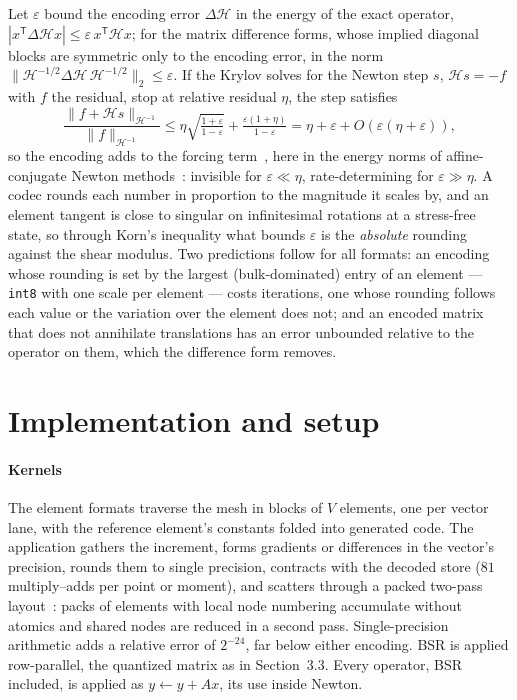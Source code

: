 \documentclass[sigconf,review]{acmart}
\newcommand{\eps}{\varepsilon}
\begin{document}
Let $\eps$ bound the encoding error $\Delta\mathcal{H}$ in the energy of the exact operator,
$|x^{\mathsf T}\Delta\mathcal{H}x|\le\eps\,x^{\mathsf T}\mathcal{H}x$; for the matrix difference
forms, whose implied diagonal blocks are symmetric only to the encoding error, in the norm
$\|\mathcal{H}^{-1/2}\Delta\mathcal{H}\,\mathcal{H}^{-1/2}\|_2\le\eps$.  If the Krylov solves for the
Newton step $s$, $\mathcal{H}s=-f$ with $f$ the residual, stop at relative residual $\eta$, the step
satisfies
\begin{equation}
  \frac{\|f+\mathcal{H}s\|_{\mathcal{H}^{-1}}}{\|f\|_{\mathcal{H}^{-1}}}
  \le \eta\sqrt{\tfrac{1+\eps}{1-\eps}} + \tfrac{\eps(1+\eta)}{1-\eps} = \eta+\eps+O(\eps(\eta+\eps)),
  \label{eq:forcing}
\end{equation}
so the encoding adds to the forcing term~\cite{Catinas2001}, here in the energy norms of
affine-conjugate Newton methods~\cite{Deuflhard2004}: invisible for $\eps\ll\eta$, rate-determining for
$\eps\gg\eta$.  A codec rounds each number in proportion to the magnitude it scales by, and an
element tangent is close to singular on infinitesimal rotations at a stress-free state, so through
Korn's inequality what bounds $\eps$ is the \emph{absolute} rounding against the shear modulus.  Two
predictions follow for all formats: an encoding whose rounding is set by the largest
(bulk-dominated) entry of an element --- \texttt{int8} with one scale per element --- costs
iterations, one whose rounding follows each value or the variation over the element does not; and
an encoded matrix that does not annihilate translations has an error unbounded relative to the
operator on them, which the difference form removes.

\section{Implementation and setup}

\paragraph{Kernels}  The element formats traverse the mesh in blocks of $V$ elements, one per vector
lane, with the reference element's constants folded into generated code.  The application gathers
the increment, forms gradients or differences in the vector's precision, rounds them to single
precision, contracts with the decoded store ($81$ multiply--adds per point or moment), and scatters
through a packed two-pass layout~\cite{PackedMesh}: packs of elements with local node numbering accumulate without
atomics and shared nodes are reduced in a second pass.  Single-precision arithmetic adds a relative
error of $2^{-24}$, far below either encoding.  BSR is applied row-parallel, the quantized matrix as
in Section~3.3.  Every operator, BSR included, is applied as $y \leftarrow y + Ax$, its use inside
Newton.
\end{document}
